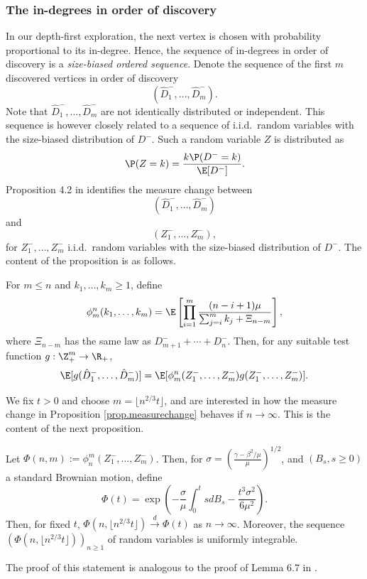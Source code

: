 \subsubsection{The in-degrees in order of discovery}
In our depth-first exploration, the next vertex is chosen with probability proportional to its in-degree. Hence, the sequence of in-degrees in order of discovery is a \emph{size-biased ordered sequence}. Denote the sequence of the first $m$ discovered vertices in order of discovery
$$(\hat{D}^-_1,\dots, \hat{D}^-_m).$$ Note that $\hat{D}_1^-,\dots , \hat{D}_m^-$ are not identically distributed or independent. This sequence is however closely related to a sequence of i.i.d.\ random variables with the size-biased distribution of $D^-$. Such a random variable $Z$ is distributed as $$\P(Z=k)=\frac{k\P(D^-=k)}{\E[D^-]}.$$
Proposition 4.2 in \cite{Conchon2018} identifies the measure change between $$(\hat{D}^-_1,\dots, \hat{D}^-_m)$$ and $$(Z_1^-,\dots,Z_m^-),$$ for $Z_1^-,\dots,Z_m^-$ i.i.d.\ random variables with the size-biased distribution of $D^-$. The content of the proposition is as follows.

\begin{proposition}\label{prop.measurechange}
For $m\leq n$ and $k_1,\dots,k_m\geq 1$, define
$$\phi_m^n(k_1,\dots,k_m)=\E\left[\prod\limits_{i=1}^m \frac{(n-i+1)\mu}{\sum_{j=i}^m k_j + \Xi_{n-m}}\right],$$
where $\Xi_{n-m}$ has the same law as $D^-_{m+1}+\cdots+D^-_n$. Then, for any suitable test function $g:\Z_+^m\to \R_+$, 
$$\E[g(\hat{D}^-_1,\dots, \hat{D}^-_m)]=\E[\phi_m^n(Z_1^-,\dots,Z_m^-)g(Z_1^-,\dots,Z_m^-)].$$
\end{proposition}

We fix $t>0$ and choose $m=\lfloor n^{2/3}t\rfloor$, and are interested in how the measure change in Proposition \ref{prop.measurechange} behaves if $n\to \infty$. This is the content of the next proposition. 
\begin{proposition}\label{prop.scalingmeasurechange}
Let $\Phi(n,m):=\phi_n^m(Z^-_1,\dots,Z^-_m)$. Then, for $\sigma=\left(\frac{\gamma-\beta^2/\mu}{\mu}\right)^{1/2}$, and $(B_s,s\geq 0)$ a standard Brownian motion, define $$\Phi(t)=\exp\left(-\frac{\sigma}{\mu}\int_0^tsdB_s - \frac{t^3 \sigma^2}{6\mu^2}\right).$$
Then, for fixed $t$, $\Phi(n,\lfloor  n^{2/3} t \rfloor)\overset{d}{\to}\Phi(t)$ as $n\to \infty$. Moreover, the sequence $(\Phi(n,\lfloor  n^{2/3} t \rfloor))_{n\geq1}$ of random variables is uniformly integrable. 
\end{proposition}
The proof of this statement is analogous to the proof of Lemma 6.7 in \cite{Conchon2018}.\\

